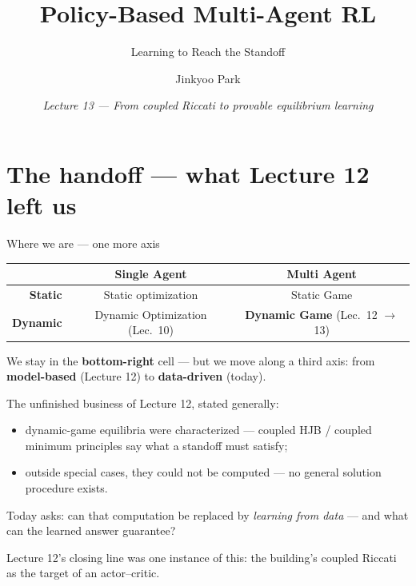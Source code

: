 \documentclass[10pt, aspectratio=169]{beamer}
\title{Policy-Based Multi-Agent RL}
\subtitle{Learning to Reach the Standoff}
\author{Jinkyoo Park}
\institute{KAIST}
\date{\textit{Lecture 13 --- From coupled Riccati to provable equilibrium learning}}
\begin{document}

\maketitle

\section{The handoff --- what Lecture 12 left us}

\begin{frame}{Where we are --- one more axis}
\vspace{2pt}
\begin{center}\footnotesize
\renewcommand{\arraystretch}{1.35}
\begin{tabular}{r|c|c}
 & \textbf{Single Agent} & \textbf{Multi Agent} \\
\hline
\textbf{Static}  & Static optimization & Static Game \\
\hline
\textbf{Dynamic} & Dynamic Optimization \scriptsize(Lec.\ 10) & \cellcolor{mDarkTeal!20}\textbf{Dynamic Game} \scriptsize(Lec.\ 12 $\to$ \alert{13}) \\
\end{tabular}
\end{center}
\smallskip

We stay in the \textbf{bottom-right} cell --- but we move along a \alert{third axis}: from \textbf{model-based} (Lecture 12) to \textbf{data-driven} (today).
\smallskip

\pause
The unfinished business of Lecture 12, stated generally:
\begin{itemize}\setlength\itemsep{2pt}
\item dynamic-game equilibria were \alert{characterized} --- coupled HJB / coupled minimum principles say what a standoff must satisfy;
\item outside special cases, they could not be \alert{computed} --- no general solution procedure exists.
\end{itemize}
\smallskip

\pause
Today asks: can that computation be replaced by \emph{learning from data} --- and what can the learned answer \alert{guarantee}?
\smallskip

{\footnotesize\textcolor{mLightBrown}{Lecture 12's closing line was one instance of this: the building's coupled Riccati as the target of an actor--critic.}}
\end{frame}
\end{document}
